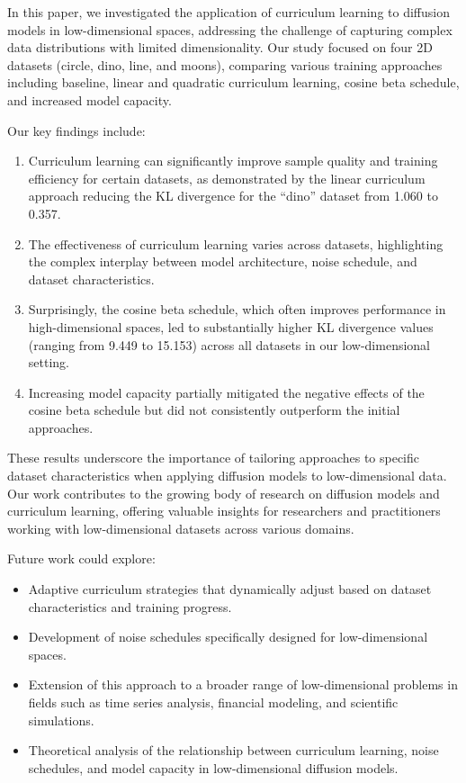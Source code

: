 \documentclass{article} %
\begin{document}
In this paper, we investigated the application of curriculum learning to diffusion models in low-dimensional spaces, addressing the challenge of capturing complex data distributions with limited dimensionality. Our study focused on four 2D datasets (circle, dino, line, and moons), comparing various training approaches including baseline, linear and quadratic curriculum learning, cosine beta schedule, and increased model capacity.

Our key findings include:

\begin{enumerate}
    \item Curriculum learning can significantly improve sample quality and training efficiency for certain datasets, as demonstrated by the linear curriculum approach reducing the KL divergence for the ``dino'' dataset from 1.060 to 0.357.
    \item The effectiveness of curriculum learning varies across datasets, highlighting the complex interplay between model architecture, noise schedule, and dataset characteristics.
    \item Surprisingly, the cosine beta schedule, which often improves performance in high-dimensional spaces, led to substantially higher KL divergence values (ranging from 9.449 to 15.153) across all datasets in our low-dimensional setting.
    \item Increasing model capacity partially mitigated the negative effects of the cosine beta schedule but did not consistently outperform the initial approaches.
\end{enumerate}

These results underscore the importance of tailoring approaches to specific dataset characteristics when applying diffusion models to low-dimensional data. Our work contributes to the growing body of research on diffusion models and curriculum learning, offering valuable insights for researchers and practitioners working with low-dimensional datasets across various domains.

Future work could explore:

\begin{itemize}
    \item Adaptive curriculum strategies that dynamically adjust based on dataset characteristics and training progress.
    \item Development of noise schedules specifically designed for low-dimensional spaces.
    \item Extension of this approach to a broader range of low-dimensional problems in fields such as time series analysis, financial modeling, and scientific simulations.
    \item Theoretical analysis of the relationship between curriculum learning, noise schedules, and model capacity in low-dimensional diffusion models.
\end{itemize}
\end{document}
